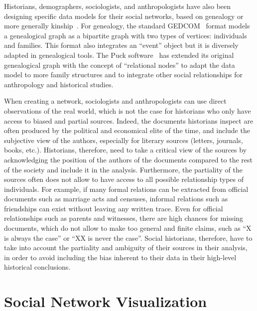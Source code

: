 Historians, demographers, sociologists, and anthropologists have also been designing specific data models for their social networks, based on genealogy or more generally kinship~\cite{hambergerKinshipNetworkAnalysis2011}.
For genealogy, the standard GEDCOM~\cite{gedcom} format models a genealogical graph as a bipartite graph with two types of vertices: individuals and families.
This format also integrates an ``event'' object but it is diversely adapted in genealogical tools.
The Puck software~\cite{hambergerScanningPatternsRelationship2014} has extended its original genealogical graph with the concept of ``relational nodes'' to adapt the data model to more family structures and to integrate other social relationships for anthropology and historical studies.

When creating a network, sociologists and anthropologists can use direct observations of the real world, which is not the case for historians who only have access to biased and partial sources.
Indeed, the documents historians inspect are often produced by the political and economical elite of the time, and include the subjective view of the authors, especially for literary sources (letters, journals, books, etc.).
Historians, therefore, need to take a critical view of the sources by acknowledging the position of the authors of the documents compared to the rest of the society and include it in the analysis\cite{lemercierQuantitativeMethodsHumanities2019}.
Furthermore, the partiality of the sources often does not allow to have access to all possible relationship types of individuals.
For example, if many formal relations can be extracted from official documents such as marriage acts and censuses, informal relations such as friendships can exist without leaving any written trace\cite{lemercier12FormalNetwork2015}.
Even for official relationships such as parents and witnesses, there are high chances for missing documents, which do not allow to make too general and finite claims, such as ``X is always the case'' or ``XX is never the case''\cite{alexanderAnalysisAncientNetwork1990}.
Social historians, therefore, have to take into account the partiality and ambiguity of their sources in their analysis, in order to avoid including the bias inherent to their data in their high-level historical conclusions.


\section{Social Network Visualization}\label{sec:social-network-visualization}


